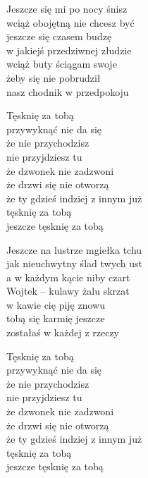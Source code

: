 \begin{text}
    Jeszcze się mi po nocy śnisz\\
    wciąż obojętną nie chcesz być\\
    jeszcze się czasem budzę\\
    w jakiejś przedziwnej złudzie\\
    wciąż buty ściągam swoje\\
    żeby się nie pobrudził\\
    nasz chodnik w przedpokoju

    Tęsknię za tobą\\
    przywyknąć nie da się\\
    że nie przychodzisz\\
    nie przyjdziesz tu\\
    że dzwonek nie zadzwoni\\
    że drzwi się nie otworzą\\
    że ty gdzieś indziej z innym już\\
    tęsknię za tobą\\
    jeszcze tęsknię za tobą

    Jeszcze na lustrze mgiełka tchu\\
    jak nieuchwytny ślad twych ust\\
    a w każdym kącie niby czart\\
    Wojtek – kulawy żalu skrzat\\
    w kawie cię piję znowu\\
    tobą się karmię jeszcze\\
    zostałaś w każdej z rzeczy

    Tęsknię za tobą\\
    przywyknąć nie da się\\
    że nie przychodzisz\\
    nie przyjdziesz tu\\
    że dzwonek nie zadzwoni\\
    że drzwi się nie otworzą\\
    że ty gdzieś indziej z innym już\\
    tęsknię za tobą\\
    jeszcze tęsknię za tobą
\end{text}
\begin{chord}

\end{chord}